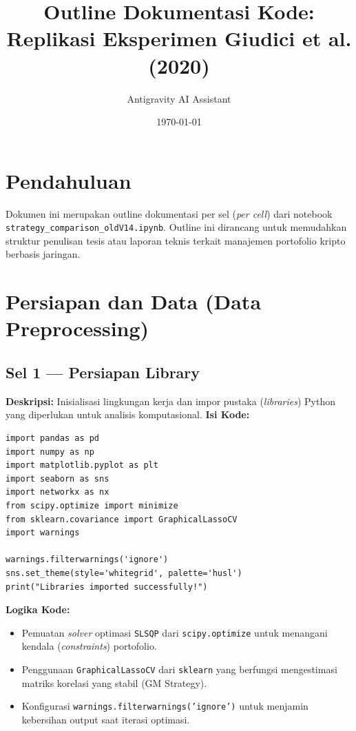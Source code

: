 \documentclass[12pt, a4paper]{article}
\title{Outline Dokumentasi Kode: Replikasi Eksperimen Giudici et al. (2020)}
\author{Antigravity AI Assistant}
\date{\today}
\begin{document}
\maketitle

\section*{Pendahuluan}
Dokumen ini merupakan outline dokumentasi per sel (\textit{per cell}) dari notebook \texttt{strategy\_comparison\_oldV14.ipynb}. Outline ini dirancang untuk memudahkan struktur penulisan tesis atau laporan teknis terkait manajemen portofolio kripto berbasis jaringan.

\tableofcontents
\newpage

\section{Persiapan dan Data (Data Preprocessing)}

\subsection{Sel 1 — Persiapan Library}
\textbf{Deskripsi:} Inisialisasi lingkungan kerja dan impor pustaka (\textit{libraries}) Python yang diperlukan untuk analisis komputasional.
\textbf{Isi Kode:}
\begin{lstlisting}
import pandas as pd
import numpy as np
import matplotlib.pyplot as plt
import seaborn as sns
import networkx as nx
from scipy.optimize import minimize
from sklearn.covariance import GraphicalLassoCV
import warnings

warnings.filterwarnings('ignore')
sns.set_theme(style='whitegrid', palette='husl')
print("Libraries imported successfully!")
\end{lstlisting}
\textbf{Logika Kode:} 
\begin{itemize}
    \item Pemuatan \textit{solver} optimasi \texttt{SLSQP} dari \texttt{scipy.optimize} untuk menangani kendala (\textit{constraints}) portofolio.
    \item Penggunaan \texttt{GraphicalLassoCV} dari \texttt{sklearn} yang berfungsi mengestimasi matriks korelasi yang stabil (GM Strategy).
    \item Konfigurasi \texttt{warnings.filterwarnings('ignore')} untuk menjamin kebersihan output saat iterasi optimasi.
\end{itemize}
\end{document}
